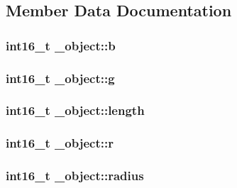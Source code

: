 \subsection{Member Data Documentation}
\hypertarget{struct__object_a104af22ae68294943efb54edb7a46b0e}{}
\subsubsection[{b}]{\setlength{\rightskip}{0pt plus 5cm}int16\+\_\+t \+\_\+object\+::b}\label{struct__object_a104af22ae68294943efb54edb7a46b0e}
\hypertarget{struct__object_a89ebce79c5f2acba52f871e6833977ff}{}
\subsubsection[{g}]{\setlength{\rightskip}{0pt plus 5cm}int16\+\_\+t \+\_\+object\+::g}\label{struct__object_a89ebce79c5f2acba52f871e6833977ff}
\hypertarget{struct__object_a9d23dfa35b2571bf0b89d4ca75f5c155}{}
\subsubsection[{length}]{\setlength{\rightskip}{0pt plus 5cm}int16\+\_\+t \+\_\+object\+::length}\label{struct__object_a9d23dfa35b2571bf0b89d4ca75f5c155}
\hypertarget{struct__object_af5318fcc501c7951e1bf261de6c29b3b}{}
\subsubsection[{r}]{\setlength{\rightskip}{0pt plus 5cm}int16\+\_\+t \+\_\+object\+::r}\label{struct__object_af5318fcc501c7951e1bf261de6c29b3b}
\hypertarget{struct__object_a870a8b24b7b3dc9244f543f096e9dae6}{}
\subsubsection[{radius}]{\setlength{\rightskip}{0pt plus 5cm}int16\+\_\+t \+\_\+object\+::radius}\label{struct__object_a870a8b24b7b3dc9244f543f096e9dae6}
\hypertarget{struct__object_a4ffae0568ef6772f8ebefa0997f79243}{}
